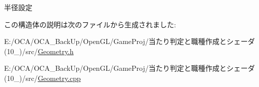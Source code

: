 半径設定 



この構造体の説明は次のファイルから生成されました\-:\begin{DoxyCompactItemize}
\item 
E\-:/\-O\-C\-A/\-O\-C\-A\-\_\-\-Back\-Up/\-Open\-G\-L/\-Game\-Proj/当たり判定と職種作成とシェーダ(10\-\_)/src/\hyperlink{_geometry_8h}{Geometry.\-h}\item 
E\-:/\-O\-C\-A/\-O\-C\-A\-\_\-\-Back\-Up/\-Open\-G\-L/\-Game\-Proj/当たり判定と職種作成とシェーダ(10\-\_)/src/\hyperlink{_geometry_8cpp}{Geometry.\-cpp}\end{DoxyCompactItemize}
